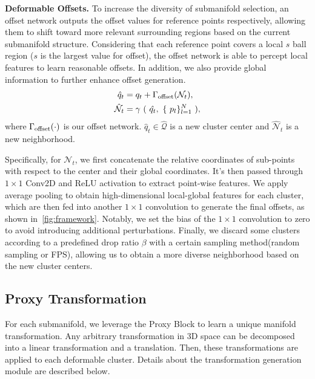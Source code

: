 \noindent \textbf{Deformable Offsets.}
To increase the diversity of submanifold selection, an offset network outputs the offset values for reference points respectively, allowing them to shift toward more relevant surrounding regions based on the current submanifold structure. Considering that each reference point covers a local $s$ ball region ($s$ is the largest value for offset), the offset network is able to percept local features to learn reasonable offsets. In addition, we also provide global information to further enhance offset generation. 
\begin{equation}\label{eq:offset}
    \begin{aligned}
        \hat{q}_{t} &= q_{t} + \Gamma_{\rm{offset}}(\mathcal{N}_t), \\
        \hat{\mathcal{N}}_t &= \gamma\ (\ \hat{q_{t}},\ \{\ p_l\}_{l=1}^N\ ),
    \end{aligned}
\end{equation}
where $\Gamma_{\rm{offset}}(\cdot)$ is our offset network. $\hat{q}_t \in \hat{\mathcal{Q}}$ is a new cluster center and $\hat{\mathcal{N}}_t$ is a new neighborhood.

Specifically, for $\mathcal{N}_t$, we first concatenate the relative coordinates of sub-points with respect to the center and their global coordinates. It's then passed through $1 \times 1$ Conv2D and ReLU activation to extract point-wise features. We apply average pooling to obtain high-dimensional local-global features for each cluster, which are then fed into another $1 \times 1$ convolution to generate the final offsets, as shown in~\cref{fig:framework}. Notably, we set the bias of the $1 \times 1$ convolution to zero to avoid introducing additional perturbations. Finally, we discard some clusters according to a predefined drop ratio $\beta$ with a certain sampling method(\eg random sampling or FPS), allowing us to obtain a more diverse neighborhood based on the new cluster centers.

\subsection{Proxy Transformation}
\label{sub:trans}
For each submanifold, we leverage the Proxy Block to learn a unique manifold transformation. Any arbitrary transformation in 3D space can be decomposed into a linear transformation and a translation. Then, these transformations are applied to each deformable cluster. Details about the transformation generation module are described below.


